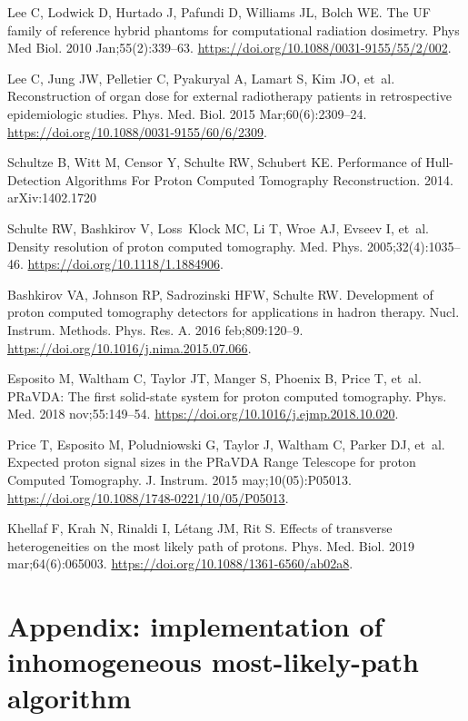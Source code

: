 \documentclass[preprint,times]{elsarticle}
\begin{document}
\begin{thebibliography}{99}
Lee C, Lodwick D, Hurtado J, Pafundi D, Williams JL, Bolch WE. {The UF family of reference hybrid phantoms for computational radiation dosimetry.} Phys Med Biol. 2010 Jan;55(2):339--63. \url{https://doi.org/10.1088/0031-9155/55/2/002}.

Lee C, Jung JW, Pelletier C, Pyakuryal A, Lamart S, Kim JO, et~al. {Reconstruction of organ dose for external radiotherapy patients in retrospective epidemiologic studies.} Phys. Med. Biol. 2015 Mar;60(6):2309--24. \url{https://doi.org/10.1088/0031-9155/60/6/2309}. 

Schultze B, Witt M, Censor Y, Schulte RW, Schubert KE. Performance of Hull-Detection Algorithms For Proton Computed Tomography Reconstruction. 2014. arXiv:1402.1720

Schulte RW, Bashkirov V, Loss~Klock MC, Li T, Wroe AJ, Evseev I, et~al. Density resolution of proton computed tomography. Med. Phys. 2005;32(4):1035--46. \url{https://doi.org/10.1118/1.1884906}.

Bashkirov VA, Johnson RP, Sadrozinski HFW, Schulte RW. {Development of proton computed tomography detectors for applications in hadron therapy.} Nucl. Instrum. Methods. Phys. Res. A. 2016 feb;809:120--9. \url{https://doi.org/10.1016/j.nima.2015.07.066}.

Esposito M, Waltham C, Taylor JT, Manger S, Phoenix B, Price T, et~al. {PRaVDA: The first solid-state system for proton computed tomography.} Phys. Med. 2018 nov;55:149--54. \url{https://doi.org/10.1016/j.ejmp.2018.10.020}.

Price T, Esposito M, Poludniowski G, Taylor J, Waltham C, Parker DJ, et~al. {Expected proton signal sizes in the PRaVDA Range Telescope for proton Computed Tomography}. J. Instrum. 2015 may;10(05):P05013. \url{https://doi.org/10.1088/1748-0221/10/05/P05013}.

Khellaf F, Krah N, Rinaldi I, L{\'{e}}tang JM, Rit S. Effects of transverse heterogeneities on the most likely path of protons. Phys. Med. Biol. 2019 mar;64(6):065003. \url{https://doi.org/10.1088/1361-6560/ab02a8}.

\end{thebibliography}

\newpage
\section*{Appendix: implementation of inhomogeneous most-likely-path algorithm}
\end{document}
